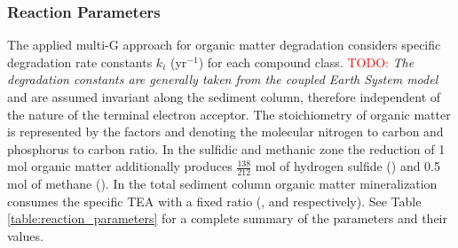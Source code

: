 \documentclass[gmd, manuscript]{copernicus}
\begin{document}
\subsubsection {Reaction Parameters}
The applied multi-G approach for organic matter degradation considers specific degradation rate constants $k_i$ (yr$^{-1}$) for each compound class. 
\textcolor{red}{TODO: } \textit{ The degradation constants are generally taken from the coupled Earth System model} 
and are assumed invariant along the sediment column, therefore independent of the nature of the terminal electron acceptor. 
The stoichiometry of organic matter is represented by the factors  and  denoting the molecular nitrogen to carbon and phosphorus to carbon ratio. 
In the sulfidic and methanic zone the 
reduction of 1 mol organic matter additionally produces $\frac{138}{212}$ mol of hydrogen sulfide () and 0.5 mol of methane (). 
In the total sediment column organic matter mineralization consumes the specific TEA with a fixed ratio (,  and  respectively). 
See Table \ref{table:reaction_parameters} for a complete summary of the parameters and their values.
\end{document}
